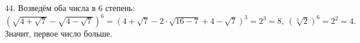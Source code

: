 44. Возведём оба числа в 6 степень: $(\sqrt{4+\sqrt{7}}-\sqrt{4-\sqrt{7}})^6=(4+\sqrt{7}-2\cdot\sqrt{16-7}+4-\sqrt{7})^3=2^3=8,\ (\sqrt[3]{2})^6=2^2=4.$ Значит, первое число больше.\\
